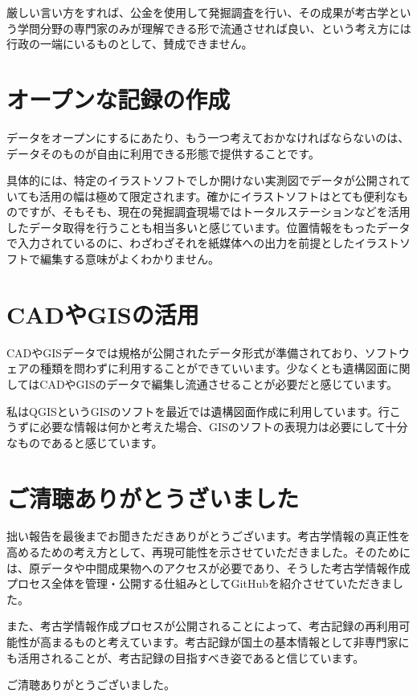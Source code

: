 \documentclass[14Q]{jsarticle}
\begin{document}
厳しい言い方をすれば、公金を使用して発掘調査を行い、その成果が考古学という学問分野の専門家のみが理解できる形で流通させれば良い、という考え方には行政の一端にいるものとして、賛成できません。

\section{オープンな記録の作成}
データをオープンにするにあたり、もう一つ考えておかなければならないのは、データそのものが自由に利用できる形態で提供することです。

具体的には、特定のイラストソフトでしか開けない実測図でデータが公開されていても活用の幅は極めて限定されます。確かにイラストソフトはとても便利なものですが、そもそも、現在の発掘調査現場ではトータルステーションなどを活用したデータ取得を行うことも相当多いと感じています。位置情報をもったデータで入力されているのに、わざわざそれを紙媒体への出力を前提としたイラストソフトで編集する意味がよくわかりません。

\section{CADやGISの活用}
CADやGISデータでは規格が公開されたデータ形式が準備されており、ソフトウェアの種類を問わずに利用することができていいます。少なくとも遺構図面に関してはCADやGISのデータで編集し流通させることが必要だと感じています。

私はQGISというGISのソフトを最近では遺構図面作成に利用しています。行こうずに必要な情報は何かと考えた場合、GISのソフトの表現力は必要にして十分なものであると感じています。

\section{ご清聴ありがとうざいました}
拙い報告を最後までお聞きただきありがとうございます。考古学情報の真正性を高めるための考え方として、再現可能性を示させていただきました。そのためには、原データや中間成果物へのアクセスが必要であり、そうした考古学情報作成プロセス全体を管理・公開する仕組みとしてGitHubを紹介させていただきました。

また、考古学情報作成プロセスが公開されることによって、考古記録の再利用可能性が高まるものと考えています。考古記録が国土の基本情報として非専門家にも活用されることが、考古記録の目指すべき姿であると信じています。

ご清聴ありがとうございました。
\end{document}
